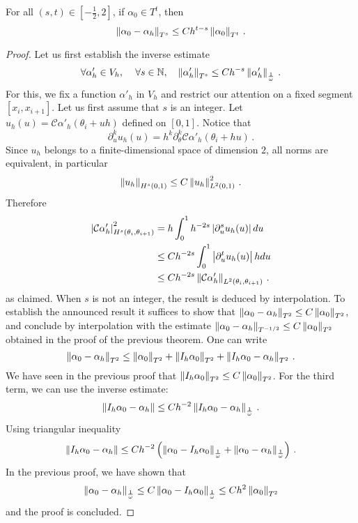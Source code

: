 \documentclass[a4paper]{article}
\begin{document}
	\begin{Cor}
		For all $(s,t) \in [-\frac{1}{2}, 2]$, if $\alpha_0\in T^t$, then
		\[\left\|\alpha_0 - \alpha_h\right\|_{T^s} \leq C h^{t - s} \left\|\alpha_0\right\|_{T^t}\,. \]
	\end{Cor}
	\begin{proof}
		Let us first establish the inverse estimate
		\[\forall \alpha'_h \in V_h, \, \quad  \forall s \in \mathbb{N}, \quad  \left\|\alpha'_h\right\|_{T^s} \leq C h^{- s} \left\|\alpha'_h\right\|_{\frac{1}{\omega}}\,.\]
		For this, we fix a function $\alpha'_h$ in $V_h$ and restrict our attention on a fixed segment $[x_i,x_{i+1}]$. Let us first assume that $s$ is an integer. Let $u_h(u) = \mathcal{C}\alpha'_h(\theta_i + u h)$ defined on $[0,1]$. Notice that 
		\[\partial_u^k u_h(u) = h^k \partial_\theta^k \mathcal{C} \alpha'_h(\theta_i + hu)\,.\] 
		Since $u_h$ belongs to a finite-dimensional space of dimension $2$, all norms are equivalent, in particular 
		\[\left\|u_h\right\|_{H^s(0,1)} \leq C \left\|u_h\right\|_{L^2(0,1)}^2\,.\]
		Therefore
		\[\begin{split}
			\left\lvert \mathcal{C}\alpha'_h \right\rvert_{H^s(\theta_i,\theta_{i+1})}^2& = h\int_{0}^{1}h^{-2s}\left\lvert \partial_u^s u_h(u) \right\rvert du \\
			 &\leq C h^{-2s} \int_{0}^1 \left\lvert \partial_u^t u_h(u) \right\rvert h du\\
			&\leq C h^{-2s}\left\|\mathcal{C}\alpha'_h\right\|_{L^2(\theta_i,\theta_{i+1})}\,.
		\end{split} \]
		as claimed. When $s$ is not an integer, the result is deduced by interpolation. To establish the announced result it suffices to show that $\left\|\alpha_0 - \alpha_h\right\|_{T^2} \leq C \left\|\alpha_0\right\|_{T^2}$, and conclude by interpolation with the estimate $\left\|\alpha_0 - \alpha_h\right\|_{T^{-1/2}} \leq C \left\|\alpha_0\right\|_{T^2}$
		obtained in the proof of the previous theorem. One can write
		\[\left\|\alpha_0 - \alpha_h\right\|_{T^2} \leq \left\|\alpha_0\right\|_{T^2} + \left\|I_h \alpha_0\right\|_{T^2} + \left\|I_h \alpha_0 - \alpha_h\right\|_{T^2}\,.\]
		We have seen in the previous proof that $\left\|I_h \alpha_0\right\|_{T^2} \leq C \left\|\alpha_0\right\|_{T^2}$. For the third term, we can use the inverse estimate:
		\[\left\|I_h \alpha_0 - \alpha_h\right\| \leq Ch^{-2}\left\|I_h \alpha_0 - \alpha_h\right\|_{\frac{1}{\omega}}\,.\]
		Using triangular inequality
		\[\left\|I_h \alpha_0 - \alpha_h\right\| \leq Ch^{-2}\left(\left\|\alpha_0 - I_h \alpha_0\right\|_{\frac{1}{\omega}} + \left\|\alpha_0 - \alpha_h\right\|_\frac{1}{\omega}\right)\,.\]
		In the previous proof, we have shown that 
		\[\left\|\alpha_0 - \alpha_h\right\|_{\frac{1}{\omega}} \leq C \left\|\alpha_0 - I_h \alpha_0\right\|_{\frac{1}{\omega}} \leq Ch^2 \left\|\alpha_0\right\|_{T^2}\]
		and the proof is concluded. 
	\end{proof}
	
\end{document}
